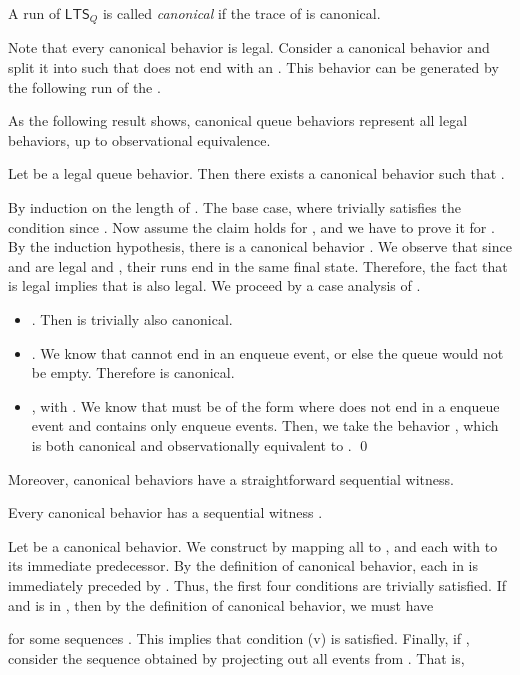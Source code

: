 \documentclass{LMCS}
\newcommand{\ltsq}{\ensuremath{{\mathsf{LTS}}_Q}}
\newcommand\mylabel[1]{\label{#1}}
\begin{document}
A run  of {\ltsq} is called {\em canonical} if the trace of  is canonical.

Note that every canonical behavior is legal. Consider a canonical behavior  
and split it into  
such that  does not end with an .
This behavior can be generated by the following run of the .


As the following result shows, canonical queue behaviors represent all legal behaviors, up to observational equivalence.

\begin{lem}\mylabel{lem:canonical-representative}
Let  be a legal queue behavior.
Then there exists a canonical behavior  such that .
\end{lem}

\proof
By induction on the length of .
The base case, where  trivially satisfies the condition since .
Now assume the claim holds for , and we have to prove it for .
By the induction hypothesis, there is a canonical behavior .
We observe that since  and  are legal and , their runs 
end in the same final state. Therefore, the fact that  is legal implies
that  is also legal.
We proceed by a case analysis of .
\begin{itemize}
\item . Then  is trivially also canonical.
\item .
We know that  cannot end in an enqueue event, or else the queue would not
be empty. Therefore  is canonical.
\item , with .
We know that  must be of the form  
where  does not end in a enqueue event and  contains only 
enqueue events.
Then, we take the behavior ,
which is both canonical and observationally equivalent to .
\qed
\end{itemize}

\noindent Moreover, canonical behaviors have a straightforward sequential witness.

\begin{lem}\mylabel{lem:canonical-seqwit}
Every canonical behavior  has a sequential witness .
\end{lem}
\proof
Let  be a canonical behavior.
We construct  by mapping all  to , and each  with  to its immediate predecessor.
By the definition of canonical behavior, each  in  is immediately preceded by .
Thus, the first four conditions are trivially satisfied.
If  and  is in , then by the definition of canonical behavior, we must have

for some sequences .
This implies that condition (v) is satisfied.
Finally, if , consider the sequence  obtained by projecting out all  events from .
That is, 
\end{document}
